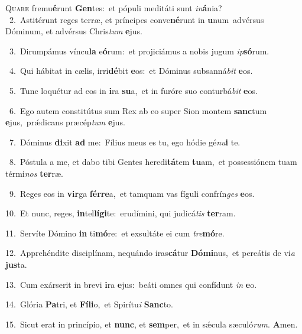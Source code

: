 \lettrine{\initial\textcolor{\initialcolor}{Q}}{uare} fremu\-\textbf{é}\-runt \textbf{Gen}\-tes:~\star et pópuli meditáti sunt \textit{in}\-\textbf{á}nia?\\
{\numbfont\textcolor{\numbcolor}{~2.}}~Astitérunt reges terræ, et príncipes conve\-\textbf{né}\-runt in \textbf{u}\-num~\star advérsus Dóminum, et advérsus Chris\textit{tum} \textbf{e}\-jus.\par
{\numbfont\textcolor{\numbcolor}{~3.}}~Dirumpámus víncu\textbf{la} e\-\textbf{ó}\-rum:~\star et projiciámus a nobis jugum \textit{ip}\-\textbf{só}rum.\par
{\numbfont\textcolor{\numbcolor}{~4.}}~Qui hábitat in cælis, irri\-\textbf{dé}\-bit \textbf{e}\-os:~\star et Dóminus subsanná\textit{bit} \textbf{e}\-os.\par
{\numbfont\textcolor{\numbcolor}{~5.}}~Tunc loquétur ad eos in \textbf{i}\-ra \textbf{su}\-a,~\star et in furóre suo conturbá\textit{bit} \textbf{e}\-os.\par
{\numbfont\textcolor{\numbcolor}{~6.}}~Ego autem constitútus sum Rex ab eo super Sion montem \textbf{sanc}\-tum \textbf{e}\-jus,~\star prǽdicans præcép\textit{tum} \textbf{e}\-jus.\par
{\numbfont\textcolor{\numbcolor}{~7.}}~Dóminus \textbf{di}\-xit \textbf{ad} me:~\star Fílius meus es tu, ego hódie gé\-\textit{nu}\-\textbf{i} te.\par
{\numbfont\textcolor{\numbcolor}{~8.}}~Póstula a me, et dabo tibi Gentes heredi\-\textbf{tá}\-tem \textbf{tu}\-am,~\star et possessiónem tuam térmi\textit{nos} \textbf{ter}\-ræ.\par
{\numbfont\textcolor{\numbcolor}{~9.}}~Reges eos in \textbf{vir}\-ga \textbf{fér}\-\textbf{re}a,~\star et tamquam vas fíguli confrín\textit{ges} \textbf{e}\-os.\par
{\numbfont\textcolor{\numbcolor}{10.}}~Et nunc, reges, \textbf{in}\-tel\-\textbf{lí}\-\textbf{gi}te:~\star erudímini, qui judicá\textit{tis} \textbf{ter}\-ram.\par
{\numbfont\textcolor{\numbcolor}{11.}}~Servíte Dómino \textbf{in} ti\-\textbf{mó}\-re:~\star et exsultáte ei cum \textit{tre}\-\textbf{mó}re.\par
{\numbfont\textcolor{\numbcolor}{12.}}~Apprehéndite disciplínam, nequándo iras\-\textbf{cá}\-tur \textbf{Dó}\-\textbf{mi}nus,~\star et pereátis de vi\textit{a} \textbf{jus}\-ta.\par
{\numbfont\textcolor{\numbcolor}{13.}}~Cum exárserit in brevi \textbf{i}\-ra \textbf{e}\-jus:~\star beáti omnes qui confídunt \textit{in} \textbf{e}\-o.\par
{\numbfont\textcolor{\numbcolor}{14.}}~Glória \textbf{Pa}\-tri, et \textbf{Fí}\-\textbf{li}o,~\star et Spirítu\textit{i} \textbf{Sanc}\-to.\par
{\numbfont\textcolor{\numbcolor}{15.}}~Sicut erat in princípio, et \textbf{nunc}\-, et \textbf{sem}\-per,~\star et in sǽcula sæculó\-\textit{rum}\-. \textbf{A}\-men.\par
